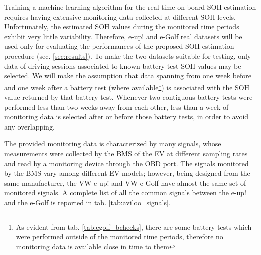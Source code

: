 Training a machine learning algorithm for the real-time on-board SOH estimation requires having extensive monitoring data collected at different SOH levels. Unfortunately, the estimated SOH values during the monitored time periods exhibit very little variability. Therefore, e-up! and e-Golf real datasets will be used only for evaluating the performances of the proposed SOH estimation procedure (sec. \ref{sec:results}). To make the two datasets suitable for testing, only data of driving sessions associated to known battery test SOH values may be selected. We will make the assumption that data spanning from one week before and one week after a battery test (where available\footnote{As evident from tab. \ref{tab:egolf_bchecks}, there are some battery tests which were performed outside of the monitored time periods, therefore no monitoring data is available close in time to them}) is associated with the SOH value returned by that battery test. Whenever two contiguous battery tests were performed less than two weeks away from each other, less than a week of monitoring data is selected after or before those battery tests, in order to avoid any overlapping.

The provided monitoring data is characterized by many signals, whose measurements were collected by the BMS of the EV at different sampling rates and read by a monitoring device through the OBD port. The signals monitored by the BMS vary among different EV models; however, being designed from the same manufacturer, the VW e-up! and VW e-Golf have almost the same set of monitored signals. A complete list of all the common signals between the e-up! and the e-Golf is reported in tab. \ref{tab:aviloo_signals}.

